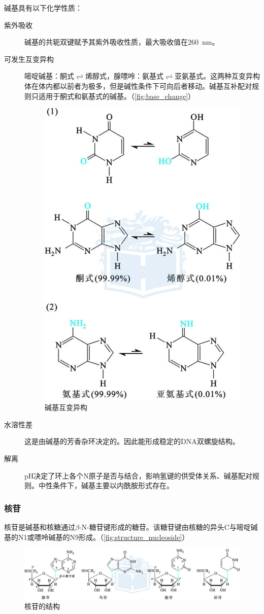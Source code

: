 碱基具有以下化学性质：
\begin{description}
	\item[紫外吸收] 碱基的共轭双键赋予其紫外吸收性质，最大吸收值在\SI{260}{\nano\meter}。
	\item[可发生互变异构] 嘧啶碱基：酮式$\rightleftharpoons$烯醇式，腺嘌呤：氨基式$\rightleftharpoons$亚氨基式。这两种互变异构体在体内都以前者为极多，但是碱性条件下可向后者移动。碱基互补配对规则只适用于酮式和氨基式的碱基。（\autoref{fig:base_change}）

	\begin{figure}[htbp]
		\centering
		\includegraphics[width=0.5\linewidth]{Pics/碱基互变异构}
		\caption{碱基互变异构}
		\label{fig:base_change}
	\end{figure}

	\item[水溶性差] 这是由碱基的芳香杂环决定的。因此能形成稳定的DNA双螺旋结构。
	\item[解离] pH决定了环上各个N原子是否与结合，影响氢键的供受体关系、碱基配对规则。中性条件下，碱基主要以内酰胺形式存在。
\end{description}

\subsubsection{核苷}

核苷是碱基和核糖通过$\beta$-N-糖苷键形成的糖苷。该糖苷键由核糖的异头C与嘧啶碱基的N1或嘌呤碱基的N9形成。（\autoref{fig:structure_nucleoside}）

\begin{figure}[htbp]
	\centering
	\includegraphics[width=\linewidth]{Pics/核苷的结构}
	\caption{核苷的结构}
	\label{fig:structure_nucleoside}
\end{figure}

